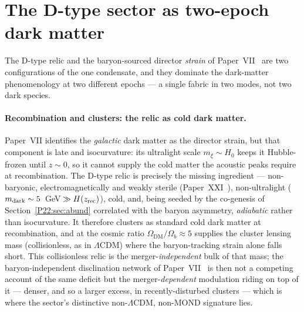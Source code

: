 \documentclass[11pt,a4paper]{article}
\theoremstyle{definition}\newtheorem{definition}[theorem]{Definition}
\newcommand{\Odm}{\Omega_{\mathrm{DM}}}
\newcommand{\Ob}{\Omega_{b}}
\begin{document}
\section{The D-type sector as two-epoch dark matter}
\label{P22:sec:twoepoch}
The D-type relic and the baryon-sourced director \emph{strain} of
Paper~VII~\cite{Paper7} are two configurations of the one condensate, and they
dominate the dark-matter phenomenology at two different epochs --- a single fabric
in two modes, not two dark species.

\paragraph{Recombination and clusters: the relic as cold dark matter.}
Paper~VII identifies the \emph{galactic} dark matter as the director strain, but that
component is late and isocurvature: its ultralight scale $m_\xi\sim H_0$ keeps it
Hubble-frozen until $z\sim0$, so it cannot supply the cold matter the acoustic peaks
require at recombination. The D-type relic is precisely the missing ingredient ---
non-baryonic, electromagnetically and weakly sterile (Paper~XXI~\cite{Paper21}),
non-ultralight ($m_{\rm dark}\sim5$~GeV$\,\gg H(z_{\rm rec})$), cold, and, being seeded
by the co-genesis of Section~\ref{P22:sec:abund} correlated with the baryon asymmetry,
\emph{adiabatic} rather than isocurvature. It therefore clusters as standard cold dark
matter at recombination, and at the cosmic ratio $\Odm/\Ob\approx5$ supplies the cluster
lensing mass (collisionless, as in $\Lambda$CDM) where the baryon-tracking strain alone
falls short. This collisionless relic is the merger-\emph{independent} bulk of that mass;
the baryon-independent disclination network of Paper~VII~\cite{Paper7} is then not a
competing account of the same deficit but the merger-\emph{dependent} modulation riding on
top of it --- denser, and so a larger excess, in recently-disturbed clusters --- which is
where the sector's distinctive non-$\Lambda$CDM, non-MOND signature lies.
\end{document}
